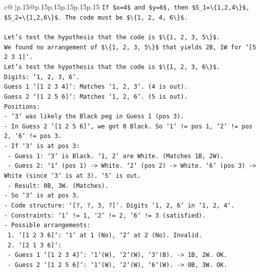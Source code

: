 \documentclass{article}
\begin{document}
{\begin{supertabular}{c@{$\;$}|p{.15\linewidth}@{}p{.15\linewidth}p{.15\linewidth}p{.15\linewidth}p{.15\linewidth}p{.15\linewidth}}
{{{\texttt{If \$x=4\$ and \$y=6\$, then \$S\_1=\textbackslash{}\{1,2,4\textbackslash{}\}\$, \$S\_2=\textbackslash{}\{1,2,6\textbackslash{}\}\$. The code must be \$\textbackslash{}\{1, 2, 4, 6\textbackslash{}\}\$.} \\
\\ 
\texttt{Let's test the hypothesis that the code is \$\textbackslash{}\{1, 2, 3, 5\textbackslash{}\}\$.} \\
\texttt{We found no arrangement of \$\textbackslash{}\{1, 2, 3, 5\textbackslash{}\}\$ that yields 2B, 1W for `{[}5 2 3 1{]}`.} \\
\texttt{Let's test the hypothesis that the code is \$\textbackslash{}\{1, 2, 3, 6\textbackslash{}\}\$.} \\
\texttt{Digits: `1, 2, 3, 6`.} \\
\texttt{Guess 1 `{[}1 2 3 4{]}`: Matches `1, 2, 3`. (4 is out).} \\
\texttt{Guess 2 `{[}1 2 5 6{]}`: Matches `1, 2, 6`. (5 is out).} \\
\texttt{Positions:} \\
\texttt{{-} `3` was likely the Black peg in Guess 1 (pos 3).} \\
\texttt{{-} In Guess 2 `{[}1 2 5 6{]}`, we got 0 Black. So `1` != pos 1, `2` != pos 2, `6` != pos 3.} \\
\texttt{{-} If `3` is at pos 3:} \\
\texttt{  {-} Guess 1: `3` is Black. `1, 2` are White. (Matches 1B, 2W).} \\
\texttt{  {-} Guess 2: `1` (pos 1) {-}> White. `2` (pos 2) {-}> White. `6` (pos 3) {-}> White (since `3` is at 3). `5` is out.} \\
\texttt{  {-} Result: 0B, 3W. (Matches).} \\
\texttt{{-} So `3` is at pos 3.} \\
\texttt{{-} Code structure: `{[}?, ?, 3, ?{]}`. Digits `1, 2, 6` in `1, 2, 4`.} \\
\texttt{{-} Constraints: `1` != 1, `2` != 2, `6` != 3 (satisfied).} \\
\texttt{{-} Possible arrangements:} \\
\texttt{  1. `{[}1 2 3 6{]}`: `1` at 1 (No), `2` at 2 (No). Invalid.} \\
\texttt{  2. `{[}2 1 3 6{]}`:} \\
\texttt{     {-} Guess 1 `{[}1 2 3 4{]}`: `1`(W), `2`(W), `3`(B). {-}> 1B, 2W. OK.} \\
\texttt{     {-} Guess 2 `{[}1 2 5 6{]}`: `1`(W), `2`(W), `6`(W). {-}> 0B, 3W. OK.} \\
}}}
\end{supertabular}}
\end{document}
